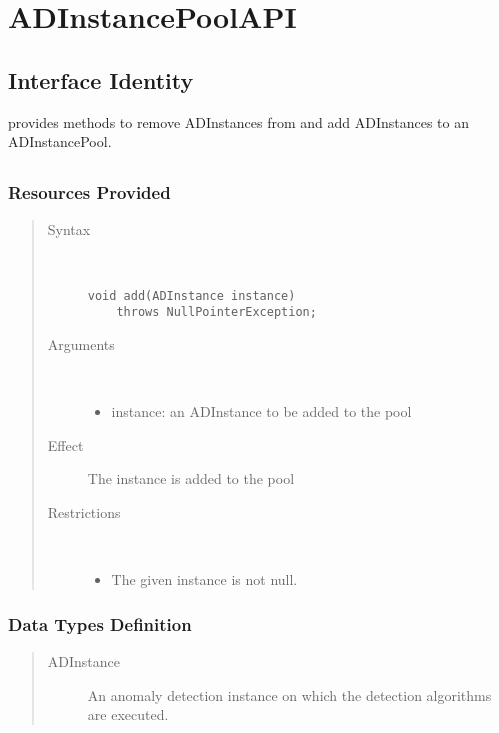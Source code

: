 \section{ADInstancePoolAPI}
\label{api:ad-instance-pool-api}

\subsection{Interface Identity}

\npar {} provides methods to remove ADInstances from
and add ADInstances to an ADInstancePool.

\subsection{}

\subsubsection{Resources Provided}

\begin{quote}
	\begin{description}
		\item[Syntax] \ 
		\begin{verbatim}
void add(ADInstance instance) 
    throws NullPointerException;
		\end{verbatim}
		\item[Arguments] \
		\begin{itemize}
			\item instance: an ADInstance to be added to the pool
		\end{itemize}
		\item[Effect] The instance is added to the pool
		\item[Restrictions] \ 
		\begin{itemize}
			\item The given instance is not null.
		\end{itemize}
	\end{description} 
\end{quote}

\subsubsection{Data Types Definition}

\begin{quote}
	\begin{description}
		\item[ADInstance] An anomaly detection instance on which the
		detection algorithms are executed.
	\end{description} 
\end{quote}

